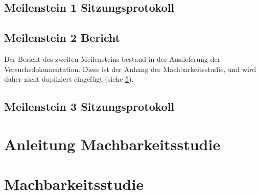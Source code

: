 \section{Meilenstein 1 Sitzungsprotokoll}


\section{Meilenstein 2 Bericht}
Der Bericht des zweiten Meilensteins bestand in der Auslieferung der Versuchsdokumentation. Diese ist der Anhang der Machbarkeitsstudie, und wird daher nicht dupliziert eingefügt (siehe \ref{app:ch:Machbarkeitsstudie}).

\section{Meilenstein 3 Sitzungsprotokoll}
\label{app:sec:protokollMeilenstein3}


\newpage
\chapter{Anleitung Machbarkeitsstudie}
\label{app:ch:AnleitungMachbarkeitsstudie}


\newpage
\chapter{Machbarkeitsstudie}
\label{app:ch:Machbarkeitsstudie}

